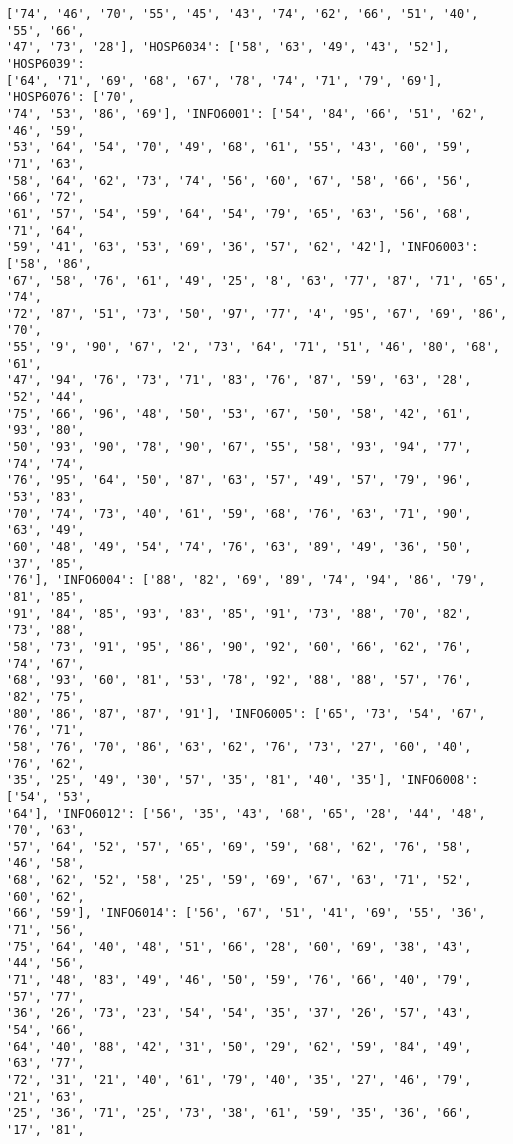 \documentclass[11pt]{article}
\begin{document}
\begin{Verbatim}[commandchars=\\\{\}]
['74', '46', '70', '55', '45', '43', '74', '62', '66', '51', '40', '55', '66',
'47', '73', '28'], 'HOSP6034': ['58', '63', '49', '43', '52'], 'HOSP6039':
['64', '71', '69', '68', '67', '78', '74', '71', '79', '69'], 'HOSP6076': ['70',
'74', '53', '86', '69'], 'INFO6001': ['54', '84', '66', '51', '62', '46', '59',
'53', '64', '54', '70', '49', '68', '61', '55', '43', '60', '59', '71', '63',
'58', '64', '62', '73', '74', '56', '60', '67', '58', '66', '56', '66', '72',
'61', '57', '54', '59', '64', '54', '79', '65', '63', '56', '68', '71', '64',
'59', '41', '63', '53', '69', '36', '57', '62', '42'], 'INFO6003': ['58', '86',
'67', '58', '76', '61', '49', '25', '8', '63', '77', '87', '71', '65', '74',
'72', '87', '51', '73', '50', '97', '77', '4', '95', '67', '69', '86', '70',
'55', '9', '90', '67', '2', '73', '64', '71', '51', '46', '80', '68', '61',
'47', '94', '76', '73', '71', '83', '76', '87', '59', '63', '28', '52', '44',
'75', '66', '96', '48', '50', '53', '67', '50', '58', '42', '61', '93', '80',
'50', '93', '90', '78', '90', '67', '55', '58', '93', '94', '77', '74', '74',
'76', '95', '64', '50', '87', '63', '57', '49', '57', '79', '96', '53', '83',
'70', '74', '73', '40', '61', '59', '68', '76', '63', '71', '90', '63', '49',
'60', '48', '49', '54', '74', '76', '63', '89', '49', '36', '50', '37', '85',
'76'], 'INFO6004': ['88', '82', '69', '89', '74', '94', '86', '79', '81', '85',
'91', '84', '85', '93', '83', '85', '91', '73', '88', '70', '82', '73', '88',
'58', '73', '91', '95', '86', '90', '92', '60', '66', '62', '76', '74', '67',
'68', '93', '60', '81', '53', '78', '92', '88', '88', '57', '76', '82', '75',
'80', '86', '87', '87', '91'], 'INFO6005': ['65', '73', '54', '67', '76', '71',
'58', '76', '70', '86', '63', '62', '76', '73', '27', '60', '40', '76', '62',
'35', '25', '49', '30', '57', '35', '81', '40', '35'], 'INFO6008': ['54', '53',
'64'], 'INFO6012': ['56', '35', '43', '68', '65', '28', '44', '48', '70', '63',
'57', '64', '52', '57', '65', '69', '59', '68', '62', '76', '58', '46', '58',
'68', '62', '52', '58', '25', '59', '69', '67', '63', '71', '52', '60', '62',
'66', '59'], 'INFO6014': ['56', '67', '51', '41', '69', '55', '36', '71', '56',
'75', '64', '40', '48', '51', '66', '28', '60', '69', '38', '43', '44', '56',
'71', '48', '83', '49', '46', '50', '59', '76', '66', '40', '79', '57', '77',
'36', '26', '73', '23', '54', '54', '35', '37', '26', '57', '43', '54', '66',
'64', '40', '88', '42', '31', '50', '29', '62', '59', '84', '49', '63', '77',
'72', '31', '21', '40', '61', '79', '40', '35', '27', '46', '79', '21', '63',
'25', '36', '71', '25', '73', '38', '61', '59', '35', '36', '66', '17', '81',

\end{Verbatim}
\end{document}
